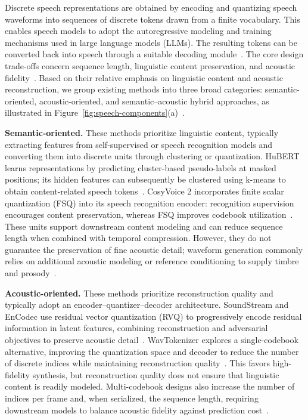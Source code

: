 Discrete speech representations are obtained by encoding and quantizing speech waveforms into sequences of discrete tokens drawn from a finite vocabulary. This enables speech models to adopt the autoregressive modeling and training mechanisms used in large language models (LLMs). The resulting tokens can be converted back into speech through a suitable decoding module~\citep{DBLP:conf/acl/CuiYJMZWGK25}. The core design trade-offs concern sequence length, linguistic content preservation, and acoustic fidelity~\citep{DBLP:journals/pami/GuoLWLSZDCLY26,DBLP:journals/tmlr/MousaviMMPSWYKPMRELLSWK25}. Based on their relative emphasis on linguistic content and acoustic reconstruction, we group existing methods into three broad categories: semantic-oriented, acoustic-oriented, and semantic--acoustic hybrid approaches, as illustrated in Figure~\ref{fig:speech-components}(a)~\citep{DBLP:conf/acl/CuiYJMZWGK25,DBLP:journals/pami/GuoLWLSZDCLY26}.

\textbf{Semantic-oriented.} These methods prioritize linguistic content, typically extracting features from self-supervised or speech recognition models and converting them into discrete units through clustering or quantization. HuBERT learns representations by predicting cluster-based pseudo-labels at masked positions; its hidden features can subsequently be clustered using k-means to obtain content-related speech tokens~\citep{DBLP:journals/taslp/HsuBTLSM21}. CosyVoice 2 incorporates finite scalar quantization (FSQ) into its speech recognition encoder: recognition supervision encourages content preservation, whereas FSQ improves codebook utilization~\citep{DBLP:journals/corr/abs-2412-10117}. These units support downstream content modeling and can reduce sequence length when combined with temporal compression. However, they do not guarantee the preservation of fine acoustic detail; waveform generation commonly relies on additional acoustic modeling or reference conditioning to supply timbre and prosody~\citep{DBLP:journals/pami/GuoLWLSZDCLY26,DBLP:journals/corr/abs-2412-10117}.

\textbf{Acoustic-oriented.} These methods prioritize reconstruction quality and typically adopt an encoder--quantizer--decoder architecture. SoundStream and EnCodec use residual vector quantization (RVQ) to progressively encode residual information in latent features, combining reconstruction and adversarial objectives to preserve acoustic detail~\citep{DBLP:journals/taslp/ZeghidourLOST22,DBLP:journals/tmlr/DefossezCSA23}. WavTokenizer explores a single-codebook alternative, improving the quantization space and decoder to reduce the number of discrete indices while maintaining reconstruction quality~\citep{DBLP:conf/iclr/Ji00C0Z0C0LZY0J25}. This favors high-fidelity synthesis, but reconstruction quality does not ensure that linguistic content is readily modeled. Multi-codebook designs also increase the number of indices per frame and, when serialized, the sequence length, requiring downstream models to balance acoustic fidelity against prediction cost~\citep{DBLP:conf/iclr/ZhangZLZQ24,DBLP:conf/aaai/YeSL00DKCPLGX25,DBLP:journals/corr/abs-2410-00037}.


